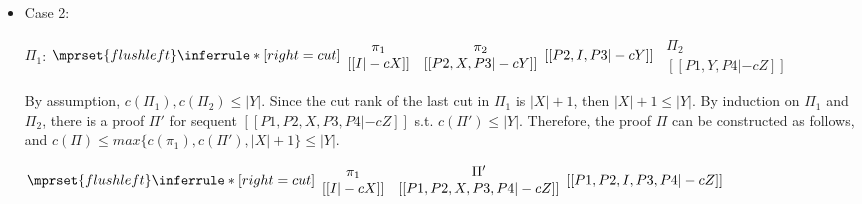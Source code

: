 \begin{itemize}
\item Case 2:
      \begin{center}
        \scriptsize
        $\Pi_1$:
        \begin{math}
          $$\mprset{flushleft}
          \inferrule* [right={\tiny cut}] {
            {
              \begin{array}{cc}
                \pi_1 & \pi_2 \\
                {[[I |-c X]]} & {[[P2, X, P3 |-c Y]]}
              \end{array}
            }
          }{[[P2, I, P3 |-c Y]]}
        \end{math}
        \qquad\qquad
        \begin{math}
          \begin{array}{c}
            \Pi_2 \\
            {[[P1, Y, P4 |-c Z]]}
          \end{array}
        \end{math}
      \end{center}
      By assumption, $c(\Pi_1),c(\Pi_2)\leq |Y|$. Since the cut rank of the last cut in
      $\Pi_1$ is $|X|+1$, then $|X|+1\leq |Y|$. By induction on $\Pi_1$ and $\Pi_2$, there is
      a proof $\Pi'$ for sequent $[[P1, P2, X, P3, P4 |-c Z]]$ s.t. $c(\Pi')\leq|Y|$.
      Therefore, the proof $\Pi$ can be constructed as follows, and
      $c(\Pi)\leq max\{c(\pi_1),c(\Pi'),|X|+1\}\leq |Y|$.
      \begin{center}
        \scriptsize
        \begin{math}
          $$\mprset{flushleft}
          \inferrule* [right={\tiny cut}] {
            {
              \begin{array}{cc}
                \pi_1 & \Pi' \\
                {[[I |-c X]]} & {[[P1, P2, X, P3, P4 |-c Z]]}
              \end{array}
            }
          }{[[P1, P2, I, P3, P4 |-c Z]]}
        \end{math}
      \end{center}
\end{itemize}



